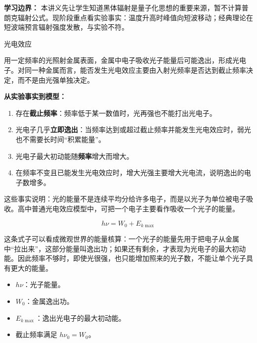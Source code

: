 \begin{center}


\label{fig:blackbody-quantum-origin}
\end{center}

\textbf{学习边界：} 本讲义先让学生知道黑体辐射是量子化思想的重要来源，暂不计算普朗克辐射公式。现阶段重点看实验事实：温度升高时峰值向短波移动；经典理论在短波端预言辐射强度发散，与实验不符。

\begin{conceptbox}{光电效应}

用一定频率的光照射金属表面，金属中电子吸收光子能量后可能逸出，形成光电子。对同一种金属而言，能否发生光电效应主要由入射光频率是否达到截止频率决定，而不是由光强单独决定。

\textbf{从实验事实到模型：}
\begin{enumerate}
  \item 存在\textbf{截止频率}：频率低于某一数值时，光再强也不能打出光电子。
  \item 光电子几乎\textbf{立即逸出}：当频率达到或超过截止频率并能发生光电效应时，弱光也不需要长时间“积累能量”。
  \item 光电子最大初动能随\textbf{频率}增大而增大。
  \item 在频率不变且已能发生光电效应时，增大光强主要增大光电流，说明逸出的电子数增多。
\end{enumerate}
这些事实说明：光的能量不是连续平均分给许多电子，而是以光子为单位被电子吸收。高中普通光电效应模型中，可把一个电子主要看作吸收一个光子的能量。

\[
\boxed{h\nu=W_0+E_{k\max}}
\]

这条式子可以看成微观世界的能量核算：一个光子的能量先用于把电子从金属中“拉出来”，这部分能量叫逸出功；如果还有剩余，才表现为光电子的最大初动能。因此频率不够时，即使光很强，也只能增加照来的光子数，不能让单个光子具有更大的能量。

\begin{center}


\label{fig:photoelectric-effect}
\end{center}

\begin{itemize}
  \item $h\nu$：光子能量。
  \item $W_0$：金属逸出功。
  \item $E_{k\max}$：逸出光电子的最大初动能。
  \item 截止频率满足 $h\nu_0=W_0$。
\end{itemize}
\end{conceptbox}

